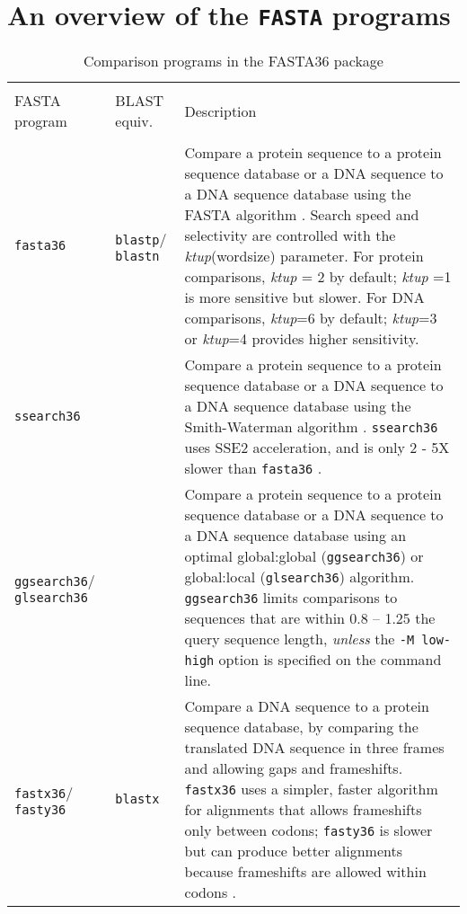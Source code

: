 \documentclass[11pt]{article}
\begin{document}
\section{An overview of the \texttt{FASTA} programs}

\begin{table}
\caption{\label{table1} Comparison programs in the FASTA36 package}
\vspace{0.5ex}
\begin{tabular}{ p{0.8in} p{0.6in} p{4.6 in}}
\hline \\[-1.0ex]
FASTA \mbox{program} & BLAST equiv. & Description \\[1.2ex]
\hline \\[-1.0ex]
\texttt{fasta36} & \texttt{blastp}/ \texttt{blastn} &
Compare a protein sequence to a protein sequence 
database or a DNA sequence to a DNA sequence database using the FASTA 
algorithm \cite{wrp881,wrp960}.  Search speed and selectivity are 
controlled with the \emph{ktup}(wordsize) parameter.  For protein 
comparisons, \emph{ktup} = 2 by default; \emph{ktup} =1 is more sensitive 
but slower.  For DNA comparisons, \emph{ktup}=6 by default; \emph{ktup}=3 or 
\emph{ktup}=4 provides higher sensitivity.\\[1 ex]

\texttt{ssearch36} &  & Compare a protein sequence to a protein sequence 
database or a DNA sequence to a DNA sequence database using the 
Smith-Waterman algorithm \cite{wat815}. \texttt{ssearch36} uses SSE2
acceleration, and is only 2 - 5X slower than \texttt{fasta36} \cite{farrar2007}. \\[1 ex]

\texttt{ggsearch36}/ \texttt{glsearch36} &  & Compare a protein sequence to a protein sequence 
database or a DNA sequence to a DNA sequence database using
an optimal global:global (\texttt{ggsearch36}) or global:local
(\texttt{glsearch36}) algorithm.  \texttt{ggsearch36} limits
comparisons to sequences that are within 0.8 -- 1.25 the query sequence length,
 \textit{unless} the \texttt{-M low-high}  option is specified on
 the command line.\\[1 ex]

\texttt{fastx36}/ \texttt{fasty36} & \texttt{blastx} &
Compare a DNA sequence to a protein
sequence database, by comparing the translated DNA sequence in three
frames and allowing gaps and frameshifts.  \texttt{fastx36} uses a
simpler, faster algorithm for alignments that allows frameshifts only
between codons; \texttt{fasty36} is slower but can produce better alignments
because frameshifts are allowed within codons \cite{wrp971}.\\[1 ex]


\end{tabular}
\end{table}
\end{document}
